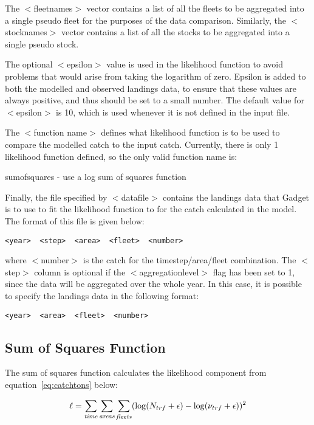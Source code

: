 \documentclass [a4paper, 10pt]{book}
\begin{document}
\bigskip
The $<$fleetnames$>$ vector contains a list of all the fleets to be aggregated into a single pseudo fleet for the purposes of the data comparison.  Similarly, the $<$stocknames$>$ vector contains a list of all the stocks to be aggregated into a single pseudo stock.

\bigskip
The optional $<$epsilon$>$ value is used in the likelihood function to avoid problems that would arise from taking the logarithm of zero.  Epsilon is added to both the modelled and observed landings data, to ensure that these values are always positive, and thus should be set to a small number.  The default value for $<$epsilon$>$ is 10, which is used whenever it is not defined in the input file.

\bigskip
The $<$function name$>$ defines what likelihood function is to be used to compare the modelled catch to the input catch.  Currently, there is only 1 likelihood function defined, so the only valid function name is:

\bigskip
sumofsquares - use a log sum of squares function

\bigskip
Finally, the file specified by $<$datafile$>$ contains the landings data that Gadget is to use to fit the likelihood function to for the catch calculated in the model.  The format of this file is given below:

{\small\begin{verbatim}
<year>  <step>  <area>  <fleet>  <number>
\end{verbatim}}

where $<$number$>$ is the catch for the timestep/area/fleet combination.  The $<$step$>$ column is optional if the $<$aggregationlevel$>$ flag has been set to 1, since the data will be aggregated over the whole year.  In this case, it is possible to specify the landings data in the following format:

{\small\begin{verbatim}
<year>  <area>  <fleet>  <number>
\end{verbatim}}

\subsection{Sum of Squares Function}
The sum of squares function calculates the likelihood component from equation~\ref{eq:catchtons} below:

\begin{equation}\label{eq:catchtons}
\ell = \sum_{\it time}\sum_{\it areas}\sum_{\it fleets} (\log(N_{trf} + \epsilon) - \log(\nu_{trf} + \epsilon))^2
\end{equation}
\end{document}
